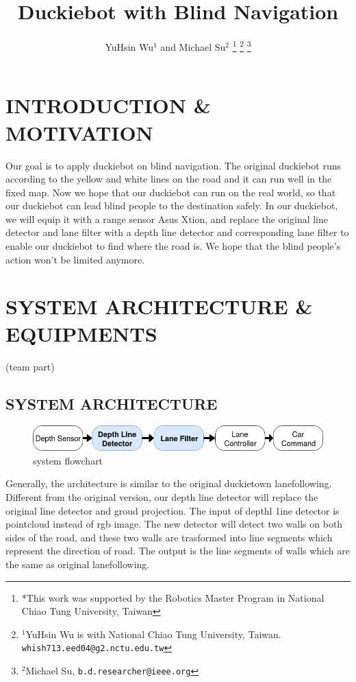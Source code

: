 \documentclass[letterpaper, 10 pt, conference]{ieeeconf}  %
\title{\LARGE \bf
Duckiebot with Blind Navigation
}
\author{YuHsin Wu$^{1}$ and Michael Su$^{2}$%
\thanks{*This work was supported by the Robotics Master Program in National Chiao Tung University, Taiwan}%
\thanks{$^{1}$YuHsin Wu is with National Chiao Tung University, Taiwan.
        {\tt\small whish713.eed04@g2.nctu.edu.tw}}%
\thanks{$^{2}$Michael Su,
        {\tt\small b.d.researcher@ieee.org}}%
}
\begin{document}
\maketitle
\thispagestyle{empty}
\pagestyle{empty}


\section{INTRODUCTION \& MOTIVATION}

Our goal is to apply duckiebot on blind navigation. The original duckiebot runs according to the yellow and white lines on the road and it can run well in the fixed map. Now we hope that our duckiebot can run on the real world, so that our duckiebot can lead blind people to the destination safely. In our duckiebot, we will equip it with a range sensor Asus Xtion, and replace the original line detector and lane filter with a depth line detector and corresponding lane filter to enable our duckiebot to find where the road is. We hope that the blind people's action won't be limited anymore.

\section{SYSTEM ARCHITECTURE \& EQUIPMENTS}

(team part)

\subsection{SYSTEM ARCHITECTURE}
\begin{figure}[h] %
\includegraphics[width=1.0\columnwidth]{system_flowchart.png}
\centering
\caption{system flowchart}
\end{figure}

Generally, the architecture is similar to the original duckietown lanefollowing. Different from the original version, our depth line detector will replace the original line detector and groud projection. The input of depthl 1ine detector is pointcloud instead of rgb image. The new detector will detect two walls on both sides of the road, and these two walls are trasformed into line segments which represent the direction of road. The output is the line segments of walls which are the same as original lanefollowing. 
\end{document}
